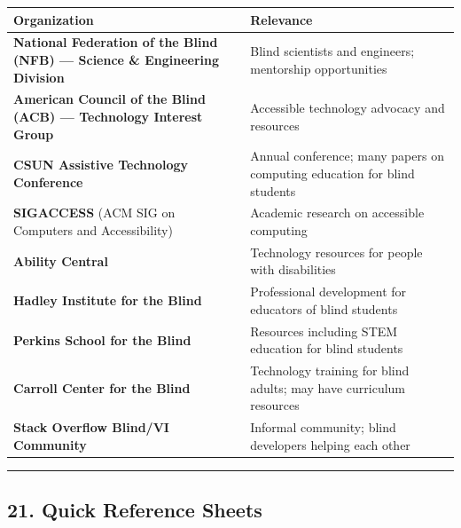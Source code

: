 \documentclass[
  justified,
  openright,
]{tufte-book}
\begin{document}
{\def\LTcaptype{none} %
\begin{longtable}[]{@{}
  >{\raggedright\arraybackslash}p{}
  >{\raggedright\arraybackslash}p{}@{}}
\toprule\noalign{}
\begin{minipage}[b]{\linewidth}\raggedright
Organization
\end{minipage} & \begin{minipage}[b]{\linewidth}\raggedright
Relevance
\end{minipage} \\
\midrule\noalign{}
\endhead
\bottomrule\noalign{}
\endlastfoot
\textbf{National Federation of the Blind (NFB) --- Science \&
Engineering Division} & Blind scientists and engineers; mentorship
opportunities \\
\textbf{American Council of the Blind (ACB) --- Technology Interest
Group} & Accessible technology advocacy and resources \\
\textbf{CSUN Assistive Technology Conference} & Annual conference; many
papers on computing education for blind students \\
\textbf{SIGACCESS} (ACM SIG on Computers and Accessibility) & Academic
research on accessible computing \\
\textbf{Ability Central} & Technology resources for people with
disabilities \\
\textbf{Hadley Institute for the Blind} & Professional development for
educators of blind students \\
\textbf{Perkins School for the Blind} & Resources including STEM
education for blind students \\
\textbf{Carroll Center for the Blind} & Technology training for blind
adults; may have curriculum resources \\
\textbf{Stack Overflow Blind/VI Community} & Informal community; blind
developers helping each other \\
\end{longtable}
}

\begin{center}\rule{0.5\linewidth}{0.5pt}\end{center}

\subsection{21. Quick Reference Sheets}\label{quick-reference-sheets}
\end{document}
